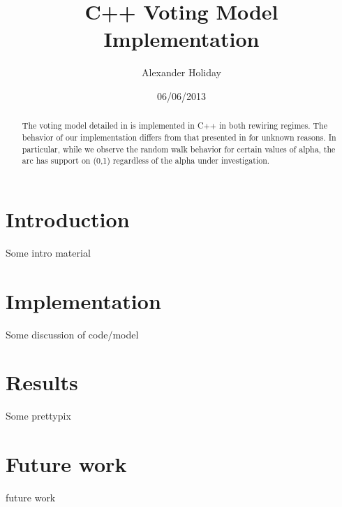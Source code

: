 \documentclass[11pt]{article}
\begin{document}
\title{C++ Voting Model Implementation}
\author{Alexander Holiday}
\date{06/06/2013}
\maketitle
\begin{abstract}
The voting model detailed in \cite{durret:pnas12} is implemented in C++ in both rewiring regimes. The behavior of our implementation differs from that presented in \cite{durret:pnas12} for unknown reasons. In particular, while we observe the random walk behavior for certain values of alpha, the arc has support on (0,1) regardless of the alpha under investigation.
\end{abstract}
\section{Introduction}
Some intro material
\section{Implementation}
Some discussion of code/model
\section{Results}
Some prettypix
\section{Future work}
future work


\end{document}
